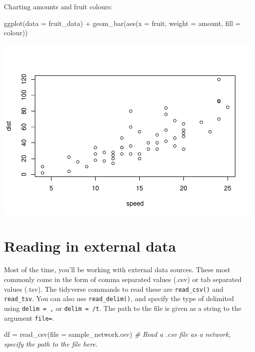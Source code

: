 \documentclass[
]{book}
\newenvironment{Shaded}{\begin{snugshade}}{\end{snugshade}}
\newcommand{\AttributeTok}[1]{\textcolor[rgb]{0.77,0.63,0.00}{#1}}
\newcommand{\CommentTok}[1]{\textcolor[rgb]{0.56,0.35,0.01}{\textit{#1}}}
\newcommand{\FunctionTok}[1]{\textcolor[rgb]{0.00,0.00,0.00}{#1}}
\newcommand{\NormalTok}[1]{#1}
\newcommand{\OtherTok}[1]{\textcolor[rgb]{0.56,0.35,0.01}{#1}}
\newcommand{\SpecialCharTok}[1]{\textcolor[rgb]{0.00,0.00,0.00}{#1}}
\newcommand{\StringTok}[1]{\textcolor[rgb]{0.31,0.60,0.02}{#1}}
\begin{document}
Charting amounts and fruit colours:

\begin{Shaded}
\begin{Highlighting}[]
\FunctionTok{ggplot}\NormalTok{(}\AttributeTok{data =}\NormalTok{ fruit\_data) }\SpecialCharTok{+} \FunctionTok{geom\_bar}\NormalTok{(}\FunctionTok{aes}\NormalTok{(}\AttributeTok{x =}\NormalTok{ fruit, }\AttributeTok{weight =}\NormalTok{ amount, }\AttributeTok{fill =}\NormalTok{ colour)) }
\end{Highlighting}
\end{Shaded}

\includegraphics{_main_files/figure-latex/unnamed-chunk-30-1.pdf}

\hypertarget{reading-in-external-data}{%
\section{Reading in external data}\label{reading-in-external-data}}

Most of the time, you'll be working with external data sources. These most commonly come in the form of comma separated values (.csv) or tab separated values (.tsv). The tidyverse commands to read these are \texttt{read\_csv()} and \texttt{read\_tsv}. You can also use \texttt{read\_delim()}, and specify the type of delimited using \texttt{delim\ =\ \textquotesingle{},\textquotesingle{}} or \texttt{delim\ =\ \textquotesingle{}/t}. The path to the file is given as a string to the argument \texttt{file=}.

\begin{Shaded}
\begin{Highlighting}[]
\NormalTok{df }\OtherTok{=} \FunctionTok{read\_csv}\NormalTok{(}\AttributeTok{file =} \StringTok{\textquotesingle{}sample\_network.csv\textquotesingle{}}\NormalTok{) }\CommentTok{\# Read a .csv file as a network, specify the path to the file here.}
\end{Highlighting}
\end{Shaded}
\end{document}
